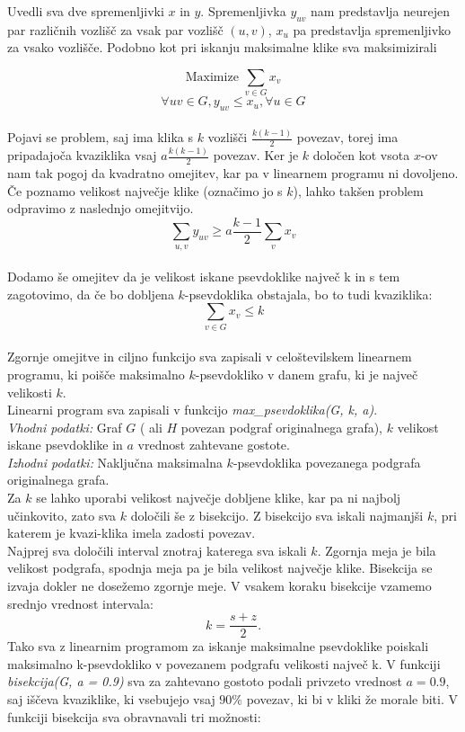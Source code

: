 \documentclass[12pt,a4paper]{amsart}
\theoremstyle{definition}
\theoremstyle{plain}
\begin{document}
\begin{itemize}
Uvedli sva dve spremenljivki $x$ in $y$. Spremenljivka $y_{uv}$ nam predstavlja neurejen par različnih vozlišč za vsak par vozlišč $(u,v)$, $x_u$ pa predstavlja spremenljivko za vsako vozlišče. Podobno kot pri iskanju maksimalne klike sva maksimizirali

 $$\text{Maximize }\sum_{v\in G}x_v$$ $$\forall uv \in G,  y_{uv} \leqslant x_u, \forall u \in G$$\\
 
Pojavi se problem, saj ima klika s $k$ vozlišči $\frac{k(k-1)}{2}$ povezav, torej ima pripadajoča kvaziklika vsaj $a \frac{ k(k-1)}{2}$ povezav. Ker je $k$ določen kot vsota $x$-ov nam tak pogoj da kvadratno omejitev, kar pa v linearnem programu ni dovoljeno. Če poznamo velikost največje klike (označimo jo s $k$), lahko takšen problem odpravimo z naslednjo omejitvijo.\\
 
 $$ \sum_{u, v} y_{uv} \geqslant a   \frac{k-1}{2}  \sum_v x_v$$ \\
 
 Dodamo še omejitev da je velikost iskane psevdoklike največ k in s tem zagotovimo, da če bo dobljena $k$-psevdoklika obstajala, bo to tudi kvaziklika:
 $$\sum_{v \in G} x_v \leqslant k$$\\

Zgornje omejitve in ciljno funkcijo sva zapisali v celoštevilskem linearnem programu, ki poišče maksimalno $k$-psevdokliko v danem grafu, ki je največ velikosti $k$. \\

Linearni program sva zapisali v funkcijo \textit{max\_psevdoklika(G, k, a)}.
\\

\textit{Vhodni podatki:} Graf $G$ ( ali $H$ povezan podgraf originalnega grafa), $k$ velikost iskane psevdoklike in $a$ vrednost zahtevane gostote.
\\

\textit{Izhodni podatki:} Naključna maksimalna $k$-psevdoklika povezanega podgrafa originalnega grafa.
\\

Za $k$ se lahko uporabi velikost največje dobljene klike, kar pa ni najbolj učinkovito, zato sva $k$ določili še z bisekcijo. Z bisekcijo sva iskali najmanjši $k$, pri katerem je kvazi-klika imela zadosti povezav. 
\\

Najprej sva določili interval znotraj katerega sva iskali $k$. Zgornja meja je bila velikost podgrafa, spodnja meja pa je bila velikost največje klike. Bisekcija se izvaja dokler ne dosežemo zgornje meje. V vsakem koraku bisekcije vzamemo srednjo vrednost intervala: $$k = \frac{s+z}{2}.$$
Tako sva z linearnim programom za iskanje maksimalne psevdoklike poiskali maksimalno k-psevdokliko v povezanem podgrafu velikosti največ k.
V funkciji \textit{bisekcija(G, a = 0.9)} sva za zahtevano gostoto podali privzeto vrednost $a = 0.9$, saj iščeva kvaziklike, ki vsebujejo vsaj $90\%$ povezav, ki bi v kliki že morale biti. V funkciji bisekcija sva obravnavali tri možnosti:\\


\end{itemize}
\end{document}
